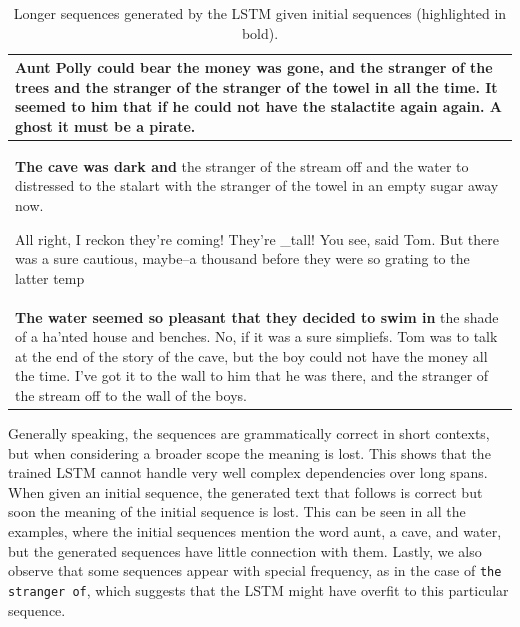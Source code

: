 \documentclass{article}
\begin{document}
\begin{table}[t]
\caption{Longer sequences generated by the LSTM given initial sequences (highlighted in bold).}
\label{tab:lst-long-samples}
\centering
\begin{tabular}{p{13cm}}
\hline
\textbf{Aunt} Polly could bear the money was gone, and the stranger of the trees and the stranger of the stranger of the towel in all the time. It seemed to him that if he could not have the stalactite again again. A ghost it must be a pirate. \\
\hline
\textbf{The cave was dark and} the stranger of the stream off and the water to distressed to the stalart with the stranger of the towel in an empty sugar away now.

All right, I reckon they're coming! They're \_tall! You see, said Tom. But there was a sure cautious, maybe--a thousand before they were so grating to the latter temp\\
\hline
\textbf{The water seemed so pleasant that they decided to swim in} the shade of a ha'nted house and benches. No, if it was a sure simpliefs. Tom was to talk at the end of the story of the cave, but the boy could not have the money all the time. I've got it to the wall to him that he was there, and the stranger of the stream off to the wall of the boys.
\end{tabular}
\end{table}

Generally speaking, the sequences are grammatically correct in short contexts, but when considering a broader scope the meaning is lost. This shows that the trained LSTM cannot handle very well complex dependencies over long spans. When given an initial sequence, the generated text that follows is correct but soon the meaning of the initial sequence is lost. This can be seen in all the examples, where the initial sequences mention the word aunt, a cave, and water, but the generated sequences have little connection with them. Lastly, we also observe that some sequences appear with special frequency, as in the case of \texttt{the stranger of}, which suggests that the LSTM might have overfit to this particular sequence.




\end{document}
